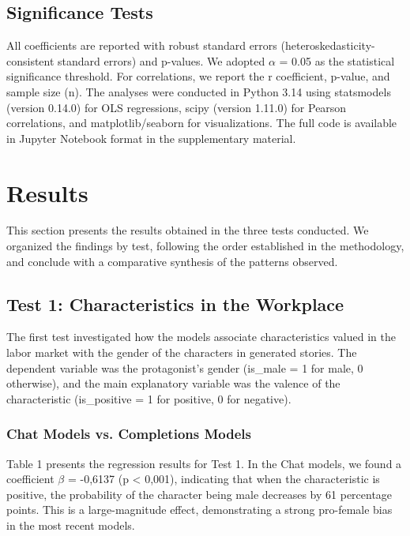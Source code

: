 \documentclass[12pt,a4paper]{article}
\begin{document}
\subsection{Significance Tests}


All coefficients are reported with robust standard errors
(heteroskedasticity-consistent standard errors) and p-values. We adopted $\alpha$
= 0.05 as the statistical significance threshold. For correlations,
we report the r coefficient, p-value, and sample size (n).
The analyses were conducted in Python 3.14 using statsmodels
(version 0.14.0) for OLS regressions, scipy (version 1.11.0) for
Pearson correlations, and matplotlib/seaborn for visualizations. The
full code is available in Jupyter Notebook format in the supplementary
material.




\section{Results}




This section presents the results obtained in the three tests conducted.
We organized the findings by test, following the order established in the
methodology, and conclude with a comparative synthesis of the patterns
observed.


\subsection{Test 1: Characteristics in the Workplace}


The first test investigated how the models associate characteristics
valued in the labor market with the gender of the characters in
generated stories. The dependent variable was the protagonist's gender
(is\_male = 1 for male, 0 otherwise), and the main explanatory variable
was the valence of the characteristic (is\_positive = 1 for
positive, 0 for negative).


\subsubsection{Chat Models vs. Completions Models}


Table 1 presents the regression results for Test 1. In the
Chat models, we found a coefficient $\beta$ = -0,6137 (p < 0,001),
indicating that when the characteristic is positive, the probability of the
character being male decreases by 61 percentage points. This is a
large-magnitude effect, demonstrating a strong pro-female bias in the
most recent models.
\end{document}
